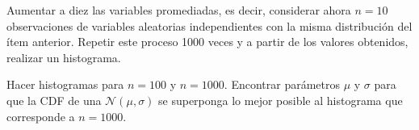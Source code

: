 \documentclass[a4paper,oneside,fleqn,11pt]{article}
\newcommand\N{\mathcal{N}}
\begin{document}
\begin{ejercicios}
\begin{ejitems}
  \item Aumentar a diez las variables promediadas, es decir, considerar ahora $n
  = 10$ observaciones de variables aleatorias independientes con la misma
  distribución del ítem anterior. Repetir este proceso 1000 veces y a partir de
  los valores obtenidos, realizar un histograma.
  
  \item Hacer histogramas para $n = 100$ y $n=1000$. Encontrar parámetros $\mu$
  y $\sigma$ para que la CDF de una $\N(\mu,\sigma)$ se superponga lo mejor
  posible al histograma que corresponde a $n=1000$.
\end{ejitems}

\end{ejercicios}
\end{document}
